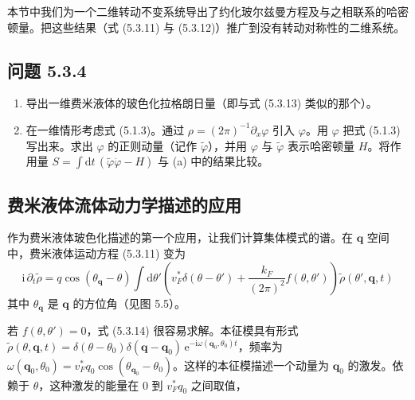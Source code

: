本节中我们为一个二维转动不变系统导出了约化玻尔兹曼方程及与之相联系的哈密顿量。把这些结果（式 (5.3.11) 与 (5.3.12)）推广到没有转动对称性的二维系统。

\subsection*{问题 5.3.4}

\begin{enumerate}
\item[(a)] 导出一维费米液体的玻色化拉格朗日量（即与式 (5.3.13) 类似的那个）。
\item[(b)] 在一维情形考虑式 (5.1.3)。通过 $\rho = (2\pi)^{-1}\partial_x \varphi$ 引入 $\varphi$。用 $\varphi$ 把式 (5.1.3) 写出来。求出 $\varphi$ 的正则动量（记作 $\tilde{\varphi}$），并用 $\varphi$ 与 $\tilde{\varphi}$ 表示哈密顿量 $H$。将作用量 $S = \int \mathrm{d}t\, (\tilde{\varphi}\dot{\varphi} - H)$ 与 (a) 中的结果比较。
\end{enumerate}

\subsection{费米液体流体动力学描述的应用}

作为费米液体玻色化描述的第一个应用，让我们计算集体模式的谱。在 $\pmb{q}$ 空间中，费米液体运动方程 (5.3.11) 变为
\begin{equation*}
\mathrm{i}\,\partial_t \tilde{\rho} = q \cos(\theta_{\pmb{q}} - \theta) \int \mathrm{d}\theta' \left( v^{*}_F \delta(\theta - \theta') + \frac{k_F}{(2\pi)^{2}} f(\theta,\theta') \right) \tilde{\rho}(\theta',\pmb{q},t) \tag{5.3.14}
\end{equation*}
其中 $\theta_{\pmb{q}}$ 是 $\pmb{q}$ 的方位角（见图 5.5）。

若 $f(\theta,\theta') = 0$，式 (5.3.14) 很容易求解。本征模具有形式 $\tilde{\rho}(\theta,\pmb{q},t) = \delta(\theta - \theta_0)\delta(\pmb{q} - \pmb{q}_0)\,\mathrm{e}^{-\mathrm{i}\omega(\pmb{q}_0,\theta_0)t}$，频率为 $\omega(\pmb{q}_0,\theta_0) = v^{*}_F q_0 \cos(\theta_{\pmb{q}_0} - \theta_0)$。这样的本征模描述一个动量为 $\pmb{q}_0$ 的激发。依赖于 $\theta$，这种激发的能量在 0 到 $v^{*}_F q_0$ 之间取值，


